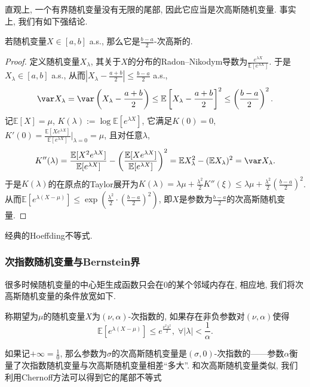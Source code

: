 直观上, 一个有界随机变量没有无限的尾部, 因此它应当是次高斯随机变量. 
事实上, 我们有如下强结论. 
\begin{lemma}[有界随机变量]\label{lemma:SubGaussianParameterOfBddRV}
	若随机变量$X \in [a, b]$ a.s., 那么它是$\frac{b-a}{2}$-次高斯的. 
\end{lemma}
\begin{proof}
	定义随机变量$X_{\lambda}$, 其关于$X$的分布的Radon–Nikodym导数为$\frac{e^{\lambda X}}{\mathbb{E}[e^{\lambda X}]}$. 
	于是$X_{\lambda} \in [a, b]$ a.s., 从而$\left|X_{\lambda} - \frac{a+b}{2} \right| \leq \frac{b-a}{2}$ a.s., 
	\begin{equation*}
		\var X_{\lambda}
		= \var \left(X_{\lambda} - \frac{a+b}{2} \right) 
		\leq \mathbb{E}\left[X_{\lambda} - \frac{a+b}{2} \right]^2 
		\leq \left(\frac{b-a}{2}\right)^2. 
	\end{equation*}
	记$\mathbb{E}[X] = \mu$, $K(\lambda) := \log \mathbb{E}[e^{\lambda X}]$, 它满足$K(0) = 0$, $K'(0) = \frac{\mathbb{E}[X e^{\lambda X}]}{\mathbb{E}[e^{\lambda X}]} \big|_{\lambda = 0} = \mu$, 且对任意$\lambda$,  
	\begin{equation*}
		K''(\lambda) 
		= \frac{\mathbb{E}[X^2 e^{\lambda X}]}{\mathbb{E}[e^{\lambda X}]} - \left( \frac{\mathbb{E}[X e^{\lambda X}]}{\mathbb{E}[e^{\lambda X}]} \right)^2
		= \mathbb{E}X_{\lambda}^2 - (\mathbb{E}X_{\lambda})^2
		= \var X_{\lambda}.  
	\end{equation*}
	于是$K(\lambda)$的在原点的Taylor展开为$K(\lambda) = \lambda \mu + \frac{\lambda^2}{2} K''(\xi) \leq \lambda \mu + \frac{\lambda^2}{2} \left(\frac{b-a}{2}\right)^2$. 
	从而$\mathbb{E}[e^{\lambda(X - \mu)}] \leq \exp\left(\frac{\lambda^2}{2} \cdot \left(\frac{b-a}{2}\right)^2\right)$, 即$X$是参数为$\frac{b-a}{2}$的次高斯随机变量. 
\end{proof}

\begin{corollary}
	经典的Hoeffding不等式. 
\end{corollary}


\subsubsection{次指数随机变量与Bernstein界}

很多时候随机变量的中心矩生成函数只会在$0$的某个邻域内存在, 相应地, 我们将次高斯随机变量的条件放宽如下. 
\begin{definition}[次指数随机变量]
	称期望为$\mu$的随机变量$X$为$(\nu, \alpha)$-次指数的, 如果存在非负参数对$(\nu, \alpha)$使得
	\begin{equation*}
		\mathbb{E}[ e^{\lambda(X - \mu)} ] 
		\leq e^{\frac{\nu^2 \lambda^2}{2}},\; 
		\forall |\lambda| < \frac{1}{\alpha}. 
	\end{equation*}
\end{definition}
\noindent
如果记$+\infty = \frac10$, 那么参数为$\sigma$的次高斯随机变量是$(\sigma, 0)$-次指数的——参数$\alpha$衡量了次指数随机变量与次高斯随机变量相差“多大”. 
和次高斯随机变量类似, 我们利用Chernoff方法可以得到它的尾部不等式

